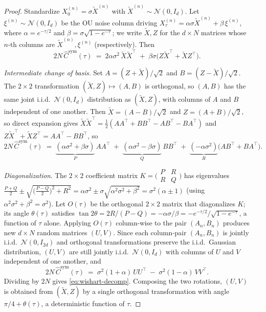 \documentclass{article}
\newcommand{\R}{\mathbb{R}}
\begin{document}
\begin{proof}
Standardize $X_0^{(n)} = \sigma\tilde X^{(n)}$ with $\tilde X^{(n)} \sim \mathcal N(0, I_d)$.
Let $\xi^{(n)} \sim \mathcal N(0, I_d)$ be the OU noise column driving
$X_\tau^{(n)} = \alpha\sigma \tilde X^{(n)} + \beta\, \xi^{(n)}$, where
$\alpha = e^{-\tau/2}$ and $\beta = \sigma\sqrt{1 - e^{-\tau}}$; we write
$\tilde X, Z$ for the $d \times N$ matrices whose $n$-th columns are
$\tilde X^{(n)}, \xi^{(n)}$ (respectively). Then
\[
2N\,\hat C^{\mathrm{sym}}(\tau) \;=\; 2\alpha\sigma^2\,\tilde X\tilde X^\top \;+\; \beta\sigma\bigl(Z\tilde X^\top + \tilde X Z^\top\bigr).
\]

\emph{Intermediate change of basis.}
Set $A = (Z + \tilde X)/\sqrt 2$ and $B = (Z - \tilde X)/\sqrt 2$. The
$2\times 2$ transformation $(\tilde X, Z) \mapsto (A, B)$ is orthogonal,
so $(A, B)$ has the same joint i.i.d.\ $\mathcal N(0, I_d)$ distribution
as $(\tilde X, Z)$, with columns of $A$ and $B$ independent of one
another. Then $\tilde X = (A - B)/\sqrt 2$ and $Z = (A + B)/\sqrt 2$, so direct expansion gives
$\tilde X\tilde X^\top = \tfrac12(AA^\top + BB^\top - AB^\top - BA^\top)$
and $Z\tilde X^\top + \tilde X Z^\top = AA^\top - BB^\top$, so
\[
2N\,\hat C^{\mathrm{sym}}(\tau) \;=\; \underbrace{(\alpha\sigma^2 + \beta\sigma)}_{P}\,AA^\top \;+\; \underbrace{(\alpha\sigma^2 - \beta\sigma)}_{Q}\,BB^\top \;+\; \underbrace{(-\alpha\sigma^2)}_{R}\bigl(AB^\top + BA^\top\bigr).
\]

\emph{Diagonalization.}
The $2{\times}2$ coefficient matrix
$K = \bigl(\begin{smallmatrix}P&R\\R&Q\end{smallmatrix}\bigr)$ has
eigenvalues $\tfrac{P+Q}{2} \pm \sqrt{\bigl(\tfrac{P-Q}{2}\bigr)^2 + R^2} = \alpha\sigma^2 \pm \sigma\sqrt{\alpha^2\sigma^2 + \beta^2} = \sigma^2(\alpha \pm 1)$
(using $\alpha^2\sigma^2 + \beta^2 = \sigma^2$). Let $O(\tau)$ be the orthogonal
$2\times 2$ matrix that diagonalizes $K$; its angle $\theta(\tau)$
satisfies $\tan 2\theta = 2R/(P-Q) = -\alpha\sigma/\beta = -e^{-\tau/2}/\sqrt{1 - e^{-\tau}}$,
a function of $\tau$ alone. Applying $O(\tau)$ column-wise to the pair
$(A_n, B_n)$ produces new $d \times N$ random matrices $(U, V)$. Since each column-pair $(A_n, B_n)$ is jointly i.i.d.\ $\mathcal N(0, I_{2d})$ and orthogonal transformations preserve the i.i.d.\ Gaussian distribution, $(U, V)$ are still jointly i.i.d.\ $\mathcal N(0, I_d)$ with columns of $U$ and $V$ independent of one another, and
\[
2N\,\hat C^{\mathrm{sym}}(\tau) \;=\; \sigma^2(1 + \alpha)\,UU^\top \;-\; \sigma^2(1 - \alpha)\,VV^\top.
\]
Dividing by $2N$ gives \eqref{eq:wishart-decomp}. Composing the two
rotations, $(U, V)$ is obtained from $(\tilde X, Z)$ by a single
orthogonal transformation with angle $\pi/4 + \theta(\tau)$, a
deterministic function of $\tau$.
\end{proof}
\end{document}
